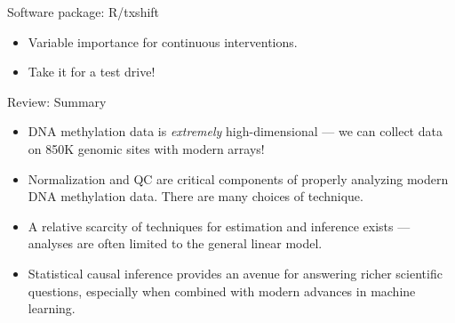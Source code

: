 \documentclass[12pt,t]{beamer}
\begin{document}
\begin{frame}[c]{Software package: R/txshift}


\begin{center}
\begin{itemize}
  \itemsep4pt
  \item Variable importance for continuous interventions.
  \item Take it for a test drive!
\end{itemize}
\end{center}


\end{frame}


\begin{frame}[c]{Review: Summary}

\begin{center}
\begin{itemize}
  \itemsep10pt
  \item DNA methylation data is \textit{extremely} high-dimensional --- we can
    collect data on 850K genomic sites with modern arrays!
  \item Normalization and QC are critical components of properly analyzing
    modern DNA methylation data. There are many choices of technique.
  \item A relative scarcity of techniques for estimation and inference exists
    --- analyses are often limited to the general linear model.
  \item Statistical causal inference provides an avenue for answering richer
    scientific questions, especially when combined with modern advances in
    machine learning.
\end{itemize}
\end{center}


\end{frame}
\end{document}
